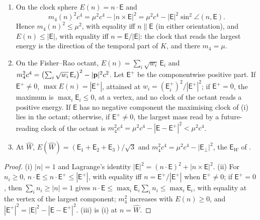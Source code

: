 \begin{proposition}
\label{r2:prop:rotate}
\begin{enumerate}[label=(\roman*),leftmargin=2.2em]
\item On the clock sphere $E(n)=n\cdot\boldsymbol{\mathsf E}$ and
\[
m_4(n)^2c^4=\mu^2c^4-|n\times\boldsymbol{\mathsf E}|^2=\mu^2c^4-|\boldsymbol{\mathsf E}|^2\sin^2\angle(n,\boldsymbol{\mathsf E}) .
\]
Hence $m_4(n)^2\le\mu^2$, with equality iff $n\parallel\boldsymbol{\mathsf E}$ (in either orientation), and $E(n)\le|\boldsymbol{\mathsf E}|$, with equality iff
$n=\boldsymbol{\mathsf E}/|\boldsymbol{\mathsf E}|$: the clock that reads the largest energy is the direction of the temporal part of $K$, and there $m_4=\mu$.
\item On the Fisher--Rao octant, $E(n)=\sum_i\sqrt{w_i}\,\mathsf E_i$ and $m_4^2c^4=\bigl(\sum_i\sqrt{w_i}\,\mathsf E_i\bigr)^2-|\mathbf p|^2c^2$. Let
$\boldsymbol{\mathsf E}^+$ be the componentwise positive part. If $\boldsymbol{\mathsf E}^+\neq0$, $\max E(n)=|\boldsymbol{\mathsf E}^+|$, attained at
$w_i=(\mathsf E_i^+)^2/|\boldsymbol{\mathsf E}^+|^2$; if $\boldsymbol{\mathsf E}^+=0$, the maximum is $\max_i\mathsf E_i\le0$, at a vertex, and no clock of the
octant reads a positive energy. If $\boldsymbol{\mathsf E}$ has no negative component the maximising clock of (i) lies in the octant; otherwise, if $\boldsymbol{\mathsf E}^+\neq0$, the largest mass read by a future-reading
clock of the octant is $m_4^2c^4=\mu^2c^4-|\boldsymbol{\mathsf E}-\boldsymbol{\mathsf E}^+|^2<\mu^2c^4$.
\item At $\widehat W$, $E(\widehat W)=(\mathsf E_1+\mathsf E_2+\mathsf E_3)/\sqrt3$ and $m_4^2c^4=\mu^2c^4-|\boldsymbol{\mathsf E}_\perp|^2$, the $\mathsf E_W$ of \cite{RE}.
\end{enumerate}
\end{proposition}

\begin{proof}
(i) $|n|=1$ and Lagrange's identity $|\boldsymbol{\mathsf E}|^2=(n\cdot\boldsymbol{\mathsf E})^2+|n\times\boldsymbol{\mathsf E}|^2$. (ii) For $n_i\ge0$,
$n\cdot\boldsymbol{\mathsf E}\le n\cdot\boldsymbol{\mathsf E}^+\le|\boldsymbol{\mathsf E}^+|$, with equality iff $n=\boldsymbol{\mathsf E}^+/|\boldsymbol{\mathsf E}^+|$
when $\boldsymbol{\mathsf E}^+\neq0$; if $\boldsymbol{\mathsf E}^+=0$, then $\sum_in_i\ge|n|=1$ gives $n\cdot\boldsymbol{\mathsf E}\le\max_i\mathsf E_i\sum_in_i\le\max_i\mathsf E_i$,
with equality at the vertex of the largest component; $m_4^2$ increases with $E(n)\ge0$, and $|\boldsymbol{\mathsf E}^+|^2=|\boldsymbol{\mathsf E}|^2-|\boldsymbol{\mathsf E}-\boldsymbol{\mathsf E}^+|^2$. (iii) is (i) at $n=\widehat W$.
\end{proof}

